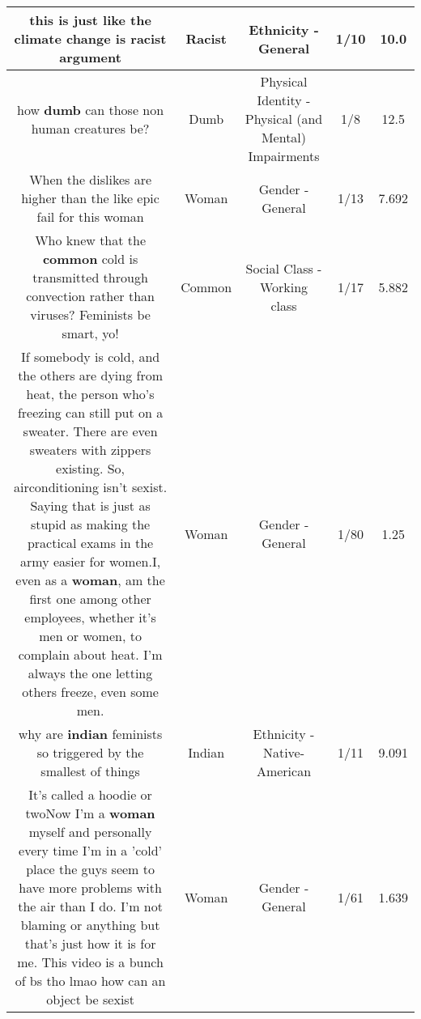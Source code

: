 \documentclass[11pt]{article}
\newlength\mylength
\begin{document}
\begin{center}
\begin{longtable}{|C{.65\mylength}|C{.30\mylength}|C{.12\mylength}|C{.12\mylength}|C{.12\mylength}|}
  \small this is just like the climate change is \textbf{racist} argument\normalsize   & Racist & Ethnicity - General & 1/10 & 10.0 \\  \hline
  \small how \textbf{dumb} can those non human creatures be?\normalsize   & Dumb & Physical Identity - Physical (and Mental) Impairments & 1/8 & 12.5 \\  \hline
  \small When the dislikes are higher than the like epic fail for this woman\normalsize   & Woman & Gender - General & 1/13 & 7.692 \\  \hline
  \small Who knew that the \textbf{common} cold is transmitted through convection rather than viruses? Feminists be smart, yo!\normalsize   & Common & Social Class - Working class & 1/17 & 5.882 \\  \hline
  \small If somebody is cold, and the others are dying from heat, the person who's freezing can still put on a sweater. There are even sweaters with zippers existing. So, airconditioning isn't sexist. Saying that is just as stupid as making the practical exams in the army easier for women.I, even as a \textbf{woman}, am the first one among other employees, whether it's men or women, to complain about heat. I'm always the one letting others freeze, even some men.\normalsize   & Woman & Gender - General & 1/80 & 1.25 \\  \hline
  \small why are \textbf{indian} feminists so triggered by the smallest of things\normalsize   & Indian & Ethnicity - Native-American & 1/11 & 9.091 \\  \hline
  \small It's called a hoodie or twoNow I'm a \textbf{woman} myself and personally every time I'm in a 'cold' place the guys seem to have more problems with the air than I do. I'm not blaming or anything but that's just how it is for me.  This video is a bunch of bs tho lmao how can an object be sexist\normalsize   & Woman & Gender - General & 1/61 & 1.639 \\  \hline

\end{longtable}
\end{center}
\end{document}
